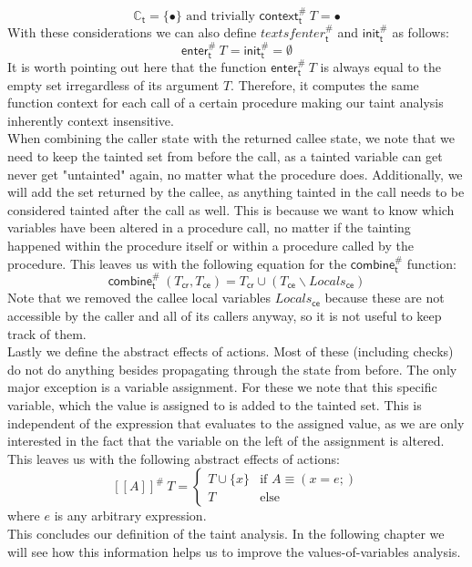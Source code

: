       \[\mathbb{C}_\textsf{t} = \{\bullet\} \text{ and trivially } \textsf{context}^{\#}_\textsf{t}\ T = \bullet\]
      With these considerations we can also define $textsf{enter}^{\#}_\textsf{t}$ and $\textsf{init}^{\#}_\textsf{t}$ as follows:
      \[\textsf{enter}^{\#}_\textsf{t}\ T = \textsf{init}^{\#}_\textsf{t} = \emptyset\]
      It is worth pointing out here that the function $\textsf{enter}^{\#}_\textsf{t}\ T$ is always equal to the empty set irregardless of its argument $T$. Therefore, it computes the same function context for each call of a certain procedure making our taint analysis inherently context insensitive.\\
      When combining the caller state with the returned callee state, we note that we need to keep the tainted set from before the call, as a tainted variable can get never get "untainted" again, no matter what the procedure does. Additionally, we will add the set returned by the callee, as anything tainted in the call needs to be considered tainted after the call as well. This is because we want to know which variables have been altered in a procedure call, no matter if the tainting happened within the procedure itself or within a procedure called by the procedure. This leaves us with the following equation for the $\textsf{combine}^{\#}_\textsf{t}$ function:
      \[ \textsf{combine}^{\#}_\textsf{t}\ (T_\textsf{cr}, T_\textsf{ce}) = T_\textsf{cr} \cup (T_\textsf{ce} \backslash Locals_\textsf{ce}) \]
      Note that we removed the callee local variables $Locals_\textsf{ce}$ because these are not accessible by the caller and all of its callers anyway, so it is not useful to keep track of them.\\
      Lastly we define the abstract effects of actions. Most of these (including checks) do not do anything besides propagating through the state from before. The only major exception is a variable assignment. For these we note that this specific variable, which the value is assigned to is added to the tainted set. This is independent of the expression that evaluates to the assigned value, as we are only interested in the fact that the variable on the left of the assignment is altered. This leaves us with the following abstract effects of actions:
      \[ [\![ A ]\!] ^{\#}\ T = \left\{ \begin{array}{lcr}
        T \cup \{x\} & \text{if }A \equiv (x = e;)\\
        T & \text{else}
      \end{array} \right. \]
      where $e$ is any arbitrary expression.\\
      This concludes our definition of the taint analysis. In the following chapter we will see how this information helps us to improve the values-of-variables analysis.

